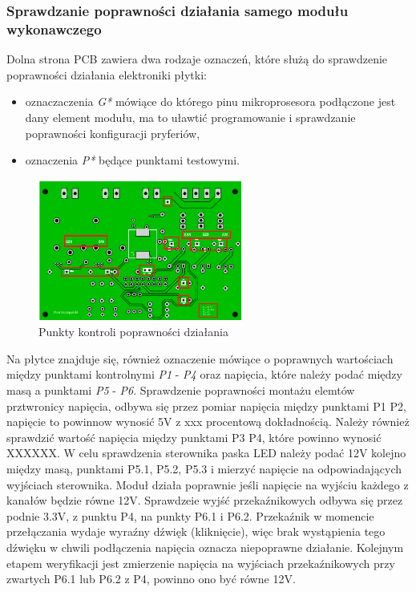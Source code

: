 \documentclass[12pt, eng, twoside, openany, final]{mgr}
\begin{document}
            \subsubsection{Sprawdzanie poprawności działania samego modułu wykonawczego}
            Dolna strona PCB zawiera dwa rodzaje oznaczeń, które służą do sprawdzenie poprawności działania elektroniki płytki:
            \begin{itemize}
                \item oznaczaczenia \emph{G*} mówiące do którego pinu mikroprosesora podłączone jest dany element modułu, ma to uławtić programowanie i sprawdzanie poprawności konfiguracji pryferiów,
                \item oznaczenia \emph{P*} będące punktami testowymi.
            \end{itemize}
               \begin{figure}[H]
                \begin{center}
                    \includegraphics[width=0.6\textwidth]{pcb_dol_zaz.png}
                    \caption{Punkty kontroli poprawności działania}
                \end{center}
                \end{figure}
            Na płytce znajduje się, również oznaczenie mówiące o poprawnych wartościach między punktami kontrolnymi \emph{P1} - \emph{P4} oraz napięcia, które należy podać między masą a punktami \emph{P5} - \emph{P6}.
            Sprawdzenie poprawności montażu elemtów prztwronicy napięcia, odbywa się przez pomiar napięcia między punktami P1 P2, napięcie to powinnow wynosić 5V z xxx procentową dokładnością.
            Należy również sprawdzić wartość napięcia między punktami P3 P4, które powinno wynosić XXXXXX.
            W celu sprawdzenia sterownika paska LED należy podać 12V kolejno między masą, punktami P5.1, P5.2, P5.3 i mierzyć napięcie na odpowiadających wyjściach sterownika. Moduł działa poprawnie jeśli napięcie na wyjściu każdego z kanałów będzie równe 12V.
            Sprawdzeie wyjść przekaźnikowych odbywa się przez podnie 3.3V, z punktu P4, na punkty P6.1 i P6.2.
            Przekaźnik w momencie przełączania wydaje wyraźny dźwięk (kliknięcie), więc brak wystąpienia tego dźwięku w chwili podłączenia napięcia oznacza niepoprawne działanie. Kolejnym etapem weryfikacji jest zmierzenie napięcia na wyjściach przekaźnikowych przy zwartych P6.1 lub P6.2 z P4, powinno ono być równe 12V.
            
\end{document}
